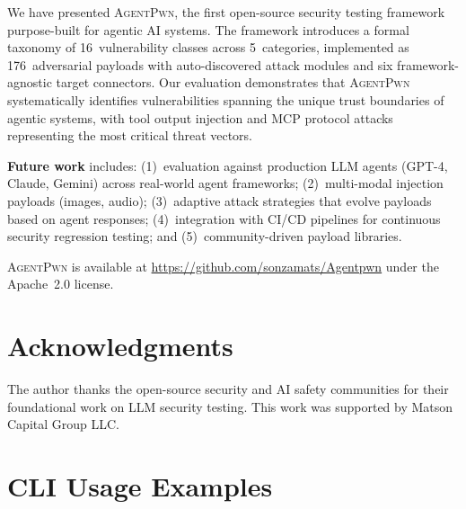 \documentclass[letterpaper,twocolumn,10pt]{article}
\newcommand{\apwn}{\textsc{AgentPwn}}
\begin{document}
We have presented \apwn{}, the first open-source security testing framework purpose-built for agentic AI systems.
The framework introduces a formal taxonomy of 16~vulnerability classes across 5~categories, implemented as 176~adversarial payloads with auto-discovered attack modules and six framework-agnostic target connectors.
Our evaluation demonstrates that \apwn{} systematically identifies vulnerabilities spanning the unique trust boundaries of agentic systems, with tool output injection and MCP protocol attacks representing the most critical threat vectors.

\textbf{Future work} includes: (1)~evaluation against production LLM agents (GPT-4, Claude, Gemini) across real-world agent frameworks; (2)~multi-modal injection payloads (images, audio); (3)~adaptive attack strategies that evolve payloads based on agent responses; (4)~integration with CI/CD pipelines for continuous security regression testing; and (5)~community-driven payload libraries.

\apwn{} is available at \url{https://github.com/sonzamats/Agentpwn} under the Apache~2.0 license.


\section*{Acknowledgments}

The author thanks the open-source security and AI safety communities for their foundational work on LLM security testing.
This work was supported by Matson Capital Group LLC.






\appendix

\section{CLI Usage Examples}
\label{app:cli}
\end{document}
